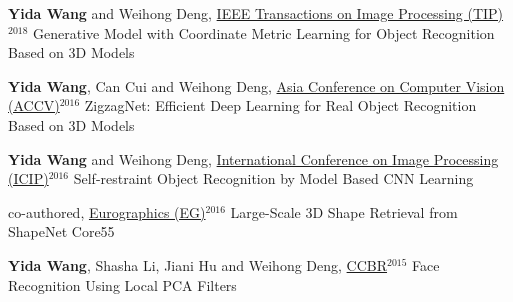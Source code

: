 \begin{cventries}
\begin{enumerate}[label={[\arabic*]}, leftmargin=*]
\item 
\cvpublication
{\textbf{Yida Wang} and Weihong Deng, \underline{IEEE Transactions on Image Processing (TIP)}$^{2018}$} %
{Generative Model with Coordinate Metric Learning for Object Recognition Based on 3D Models} %
{} %
{} %


\item 
\cvpublication
{\textbf{Yida Wang}, Can Cui and Weihong Deng, \underline{Asia Conference on Computer Vision (ACCV)}$^{2016}$} %
{ZigzagNet: Efficient Deep Learning for Real Object Recognition Based on 3D Models} %
{} %
{} %


\item 
\cvpublication
{\textbf{Yida Wang} and Weihong Deng, \underline{International Conference on Image Processing (ICIP)}$^{2016}$} %
{Self-restraint Object Recognition by Model Based CNN Learning} %
{} %
{} %


\item 
\cvpublication
{co-authored, \underline{Eurographics (EG)}$^{2016}$} %
{Large-Scale 3D Shape Retrieval from ShapeNet Core55} %
{} %
{} %


\item 
\cvpublication
{\textbf{Yida Wang}, Shasha Li, Jiani Hu and Weihong Deng, \underline{CCBR}$^{2015}$} %
{Face Recognition Using Local PCA Filters} %
{} %
{} %
\end{enumerate}


\end{cventries}
